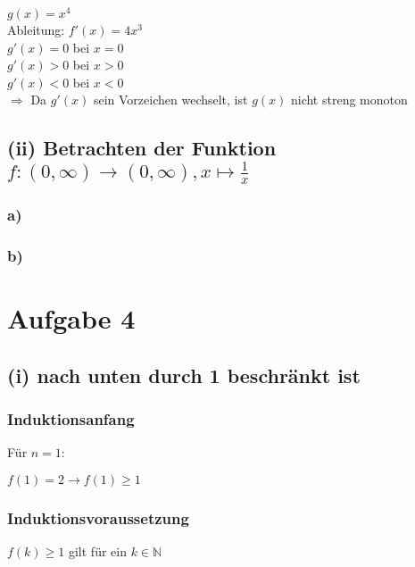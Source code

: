 \documentclass{article}
\begin{document}
\begin{center}
$g(x)=x^4$ \\
Ableitung: $f'(x)=4x^3$ \\
$g'(x) = 0$ bei $x=0$ \\
$g'(x) > 0$ bei $x > 0$ \\
$g'(x) < 0$ bei $x < 0$ \\
$\Longrightarrow$ Da $g'(x)$ sein Vorzeichen wechselt, ist $g(x)$ nicht streng monoton
\end{center}

\subsection{(ii) Betrachten der Funktion $f:(0,\infty)\xrightarrow{}(0,\infty), x \mapsto \frac{1}{x}$}
\subsubsection{a)}

\subsubsection{b)}

\section{Aufgabe 4}
\subsection{(i) nach unten durch 1 beschränkt ist}
\subsubsection{Induktionsanfang}
Für $n = 1$:
\begin{center}
    $f(1) = 2 \longrightarrow f(1) \geq 1$
\end{center}
\subsubsection{Induktionsvoraussetzung}
\begin{center}
$f(k) \geq 1$ gilt für ein $k \in \mathbb{N}$ \\
\end{center}
\end{document}
